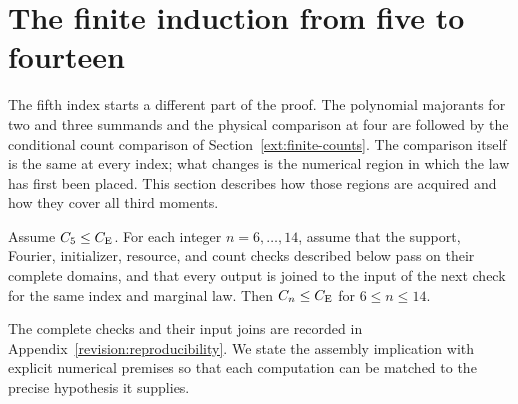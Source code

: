 \section{The finite induction from five to fourteen}
\label{ext:finite-five-fourteen}
The fifth index starts a different part of the proof. The polynomial
majorants for two and three summands and the physical comparison at four
are followed by the conditional count comparison of
Section~\ref{ext:finite-counts}.
The comparison itself is the same at every index; what changes is the
numerical region in which the law has first been placed. This section
describes how those regions are acquired and how they cover all third
moments.



\begin{proposition}
\label{ext:finite-five-fourteen-assembly}
Assume $C_5\le C_{\mathrm E}$. For each integer $n=6,\ldots,14$, assume that
the support, Fourier, initializer, resource, and count checks described
below pass on their complete domains, and that every output is joined
to the input of the next check for the same index and marginal law.
Then $C_n\le C_{\mathrm E}$ for $6\le n\le14$.
\end{proposition}

The complete checks and their input joins are recorded in
Appendix~\ref{revision:reproducibility}. We state the assembly implication
with explicit numerical premises so that each computation can be matched
to the precise hypothesis it supplies.

